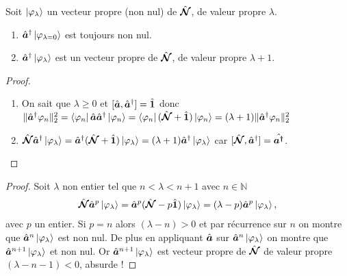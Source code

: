 \begin{Lemm}
Soit $\ket{\varphi_\lambda}$ un vecteur propre (non nul) de $\hat{\bm{\mathcal N}}$, de valeur propre $\lambda$.
    \begin{enumerate}[label = \roman*)]
        \item $\hat{\bm{a}}^\dag  \ket{\varphi_{\lambda = 0}}$ est toujours non nul.
        \item $\hat{\bm{a}}^\dag  \ket{\varphi_{\lambda}}$ est un vecteur propre  de $\hat{\bm{\mathcal N}}$, de valeur propre $\lambda +1$.
    \end{enumerate}
\end{Lemm}
\begin{proof}
    {~~~}
    \begin{enumerate}[label = \roman*)]
        \item On sait que $\lambda \geq 0 $ et $[\hat{\bm{a}},\hat{\bm{a}}^\dag] = \hat{\bm{1}}$ donc $\Vert \hat{\bm{a}}^\dag \varphi_n \Vert_2^2 = \bra{\varphi_n} \hat{\bm{a}} \hat{\bm{a}}^\dag \ket{\varphi_n} =  \bra{\varphi_n} (\hat{\bm{\mathcal N }} + \hat{\bm{1}}) \ket{\varphi_n} = (\lambda +1 ) \Vert \hat{\bm{a}}^\dag \varphi_n \Vert_2^2 $ 
        \item $\hat{\bm{\mathcal N}} \hat{\bm{a}}^\dag\ket{\varphi_\lambda} = \hat{\bm{a}}^\dag (\hat{\bm{\mathcal N}} + \hat{\bm{1}}) \ket{\varphi_\lambda} = (\lambda  + 1 )\hat{\bm{a}}^\dag \ket{\varphi_\lambda}$ car $[\hat{\bm{\mathcal N}} , \hat{\bm{a}}^\dag] = \hat{\bm{a^\dag}}$.
    \end{enumerate}
\end{proof}
\begin{Lemm}
\end{Lemm}
\begin{proof}
    Soit $\lambda$ non entier tel que $n < \lambda < n+1 $ avec $n \in \mathbb N$
    \begin{eqnarray}
        \hat{\bm{\mathcal N}} \hat{\bm{a}}^p \ket{\varphi_\lambda} = \hat{\bm{a}}^p ( \hat{\bm{\mathcal N}} - p \hat{\bm{1}}) \ket{\varphi_\lambda} = ( \lambda  - p) \hat{\bm{a}}^p \ket{\varphi_\lambda},
    \end{eqnarray}
    avec $p$ un entier. Si $p = n $ alors $( \lambda  - n ) >0 $ et par récurrence sur $n$ on montre que $\hat{\bm{a}}^n \ket{\varphi_\lambda}$ est non nul. De plus en appliquant $\hat{\bm{a}}$ sur $\hat{\bm{a}}^n \ket{\varphi_\lambda}$ on montre que $\hat{\bm{a}}^{n+1} \ket{\varphi_\lambda}$ et non nul. Or $\hat{\bm{a}}^{n+1} \ket{\varphi_\lambda}$ est vecteur propre de $\hat{\bm{\mathcal N}}$ de valeur propre $(\lambda - n -1) < 0$, absurde !
\end{proof}

